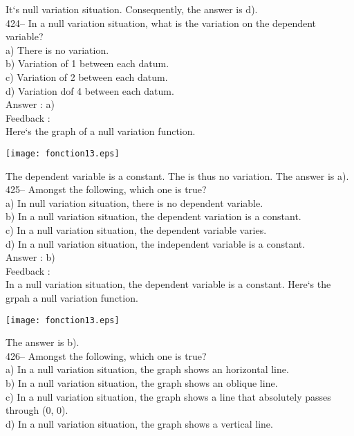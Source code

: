 \documentclass[letterpaper, 12pt]{article}
\begin{document}
It`s null variation situation.  Consequently, the answer is d).\\

424-- In a null variation situation, what is the variation on the dependent variable?\\
a) There is no variation.\\
b) Variation of 1 between each datum.\\
c) Variation of 2 between each datum.\\
d) Variation dof 4 between each datum.\\

Answer :  a)\\

Feedback : \\
Here`s the graph of a null variation function.\\
    \begin{center}
    \texttt{[image: fonction13.eps]}
    \end{center}
The dependent variable is a constant. The is thus no variation.
  The answer is a).\\

425-- Amongst the following, which one is true?\\
a) In null variation situation, there is no dependent variable.\\
b) In a null variation situation, the dependent variation is a constant.\\
c) In a null variation situation, the dependent variable varies.\\
d) In a null variation situation, the independent variable is a constant.\\


Answer :  b)\\

Feedback : \\
In a null variation situation, the dependent variable is a constant. Here`s the grpah a null variation function.\\
    \begin{center}
    \texttt{[image: fonction13.eps]}
    \end{center}

The answer is b).\\

426-- Amongst the following, which one is true?\\
a) In a null variation situation, the graph shows an horizontal line.\\
b) In a null variation situation, the graph shows an oblique line.\\
c) In a null variation situation, the graph shows a line that absolutely passes through (0, 0).\\
d) In a null variation situation, the graph shows a vertical line.\\
\end{document}

